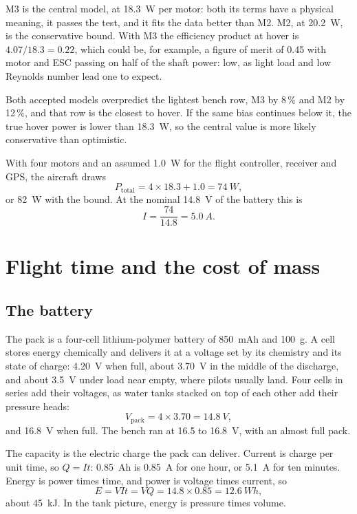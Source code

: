M3 is the central model, at \SI{18.3}{W} per motor: both its terms have a physical meaning, it passes the test, and it fits the data better than M2. M2, at \SI{20.2}{W}, is the conservative bound. With M3 the efficiency product at hover is $4.07/18.3 = 0.22$, which could be, for example, a figure of merit of 0.45 with motor and ESC passing on half of the shaft power: low, as light load and low Reynolds number lead one to expect.

Both accepted models overpredict the lightest bench row, M3 by 8\,\% and M2 by 12\,\%, and that row is the closest to hover. If the same bias continues below it, the true hover power is lower than \SI{18.3}{W}, so the central value is more likely conservative than optimistic.

With four motors and an assumed \SI{1.0}{W} for the flight controller, receiver and GPS, the aircraft draws
\begin{equation}
P_\text{total} = 4 \times 18.3 + 1.0 = \SI{74}{W},
\end{equation}
or \SI{82}{W} with the bound. At the nominal \SI{14.8}{V} of the battery this is
\begin{equation}
I = \frac{74}{14.8} = \SI{5.0}{A}.
\end{equation}

\section{Flight time and the cost of mass}\label{sec:sizing-endurance}

\subsection{The battery}

The pack is a four-cell lithium-polymer battery of \SI{850}{mAh} and \SI{100}{g}. A cell stores energy chemically and delivers it at a voltage set by its chemistry and its state of charge: \SI{4.20}{V} when full, about \SI{3.70}{V} in the middle of the discharge, and about \SI{3.5}{V} under load near empty, where pilots usually land. Four cells in series add their voltages, as water tanks stacked on top of each other add their pressure heads:
\begin{equation}
V_\text{pack} = 4 \times 3.70 = \SI{14.8}{V},
\end{equation}
and \SI{16.8}{V} when full. The bench ran at 16.5 to \SI{16.8}{V}, with an almost full pack.

The capacity is the electric charge the pack can deliver. Current is charge per unit time, so $Q = It$: \SI{0.85}{Ah} is \SI{0.85}{A} for one hour, or \SI{5.1}{A} for ten minutes. Energy is power times time, and power is voltage times current, so
\begin{equation}
E = V I t = V Q = 14.8 \times 0.85 = \SI{12.6}{Wh},
\end{equation}
about \SI{45}{kJ}. In the tank picture, energy is pressure times volume.

